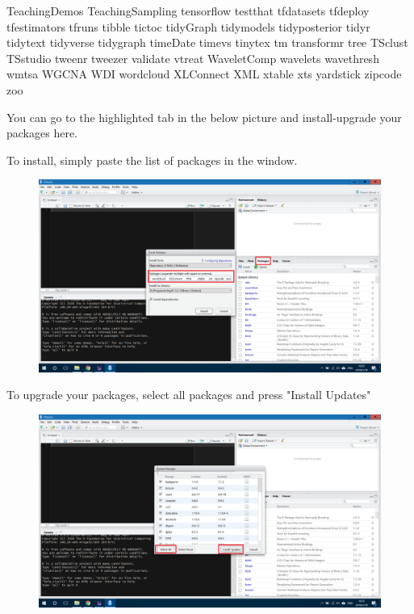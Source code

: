 \documentclass[11pt]{article} %
\begin{document}
\begin{itemize}
        TeachingDemos
        TeachingSampling
        tensorflow
        testthat
        tfdatasets
        tfdeploy
        tfestimators
        tfruns 
        tibble
        tictoc
        tidyGraph
        tidymodels
        tidyposterior
        tidyr 
        tidytext
        tidyverse
        tidygraph
        timeDate
        timevs
        tinytex
        tm
        transformr
        tree 
        TSclust
        TSstudio
        tweenr
        tweezer
        validate
        vtreat
        WaveletComp
        wavelets
        wavethresh
        wmtsa
        WGCNA
        WDI 
        wordcloud 
        XLConnect  
        XML 
        xtable
        xts 
        yardstick
        zipcode
        zoo 
  
  	You can go to the highlighted tab in the below picture and install-upgrade your packages here. 
    
    To install, simply paste the list of packages in the window. 
  
  	\begin{figure}[h!]
  		\centering
  		\includegraphics[width=0.7\linewidth]{figs/installPackages}
  		\caption{}
  		\label{fig:installpackages}
  	\end{figure}
  	
  	To upgrade your packages, select all packages and press "Install Updates"
  		
  	\begin{figure}[h!]
  		\centering
  		\includegraphics[width=0.7\linewidth]{figs/upgradePackages}
  		\caption{}
  		\label{fig:upgradepackages}
  	\end{figure}
  
%    
%  
%  
  
  
    \end{itemize}
  
\end{document}
